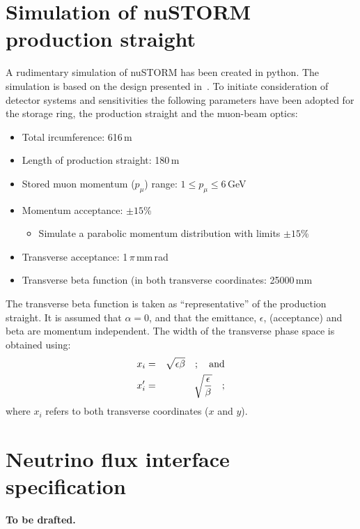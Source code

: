 \section*{Simulation of nuSTORM production straight}
A rudimentary simulation of nuSTORM has been created in python.
The simulation is based on the design presented in~\cite{Ahdida:2020whw}.
To initiate consideration of detector systems and sensitivities the
following parameters have been adopted for the storage ring, the
production straight and the muon-beam optics:
\begin{itemize}
  \item Total ircumference: 616\,m
  \item Length of production straight: 180\,m
  \item Stored muon momentum ($p_\mu$) range: $1 \le p_\mu \le 6$\,GeV
  \item Momentum acceptance: $\pm 15$\%
    \begin{itemize}
      \item Simulate a parabolic momentum distribution with limits
        $\pm 15$\%
    \end{itemize}
  \item Transverse acceptance: 1\,$\pi$\,mm\,rad
  \item Transverse beta function (in both transverse coordinates: 25000\,mm
\end{itemize}
The transverse beta function is taken as “representative” of the
production straight.
It is assumed that $\alpha=0$, and that the emittance, $\epsilon$,
(acceptance) and beta are momentum independent. 
The width of the transverse phase space is obtained using:
\begin{eqnarray}
  x_i        & = & \sqrt{\epsilon \beta} \quad {\rm ; \quad and} \nonumber \\
  x_i^\prime  & = & \sqrt{\frac{\epsilon}{\beta}} \quad ;  \nonumber
\end{eqnarray}
where $x_i$ refers to both transverse coordinates ($x$ and $y$).

\section*{Neutrino flux interface specification}
\textbf{\color{red} To be drafted.}
